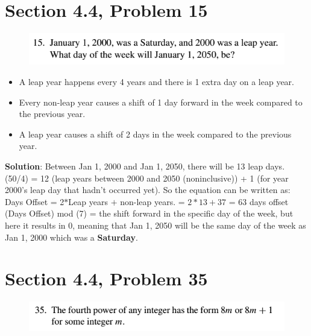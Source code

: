 \documentclass{article}
\begin{document}
\begin{large}
\clearpage
\header

\section*{Section 4.4, Problem 15}

\begin{figure}[h]
\includegraphics{HW2Prob2}
\centering
\end{figure}

\begin{itemize}
 \item A leap year happens every 4 years and there is 1 extra day on a leap year.
 \item Every non-leap year causes a shift of 1 day forward in the week compared to the previous year. 
\item A leap year causes a shift of 2 days in the week compared to the previous year.
\end{itemize}
\textbf{Solution}: Between Jan 1, 2000 and Jan 1, 2050, there will be 13 leap days.
(50/4) = 12 (leap years between 2000 and 2050 (noninclusive)) + 1 (for year 2000's leap day that hadn't occurred yet). 
\newline \newline
So the equation can be written as: Days Offset = 2$*$Leap years $+$ non-leap years. 
\newline = $2*13 + 37$ 
\newline = 63 days offset
\newline (Days Offset) mod (7) = the shift forward in the specific day of the week, but here it results in 0, meaning that Jan 1,
2050 will be the same day of the week as Jan 1, 2000 which was a \textbf{Saturday}.

\clearpage
\header

\section*{Section 4.4, Problem 35}

\begin{figure}[h]
\includegraphics{HW2Prob3}
\centering
\end{figure}




\end{large}
\end{document}
